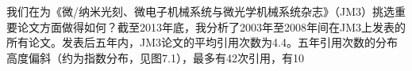 我们在为《微/纳米光刻、微电子机械系统与微光学机械系统杂志》（JM3）挑选重要论文方面做得如何？截至2013年底，我分析了2003年至2008年间在JM3上发表的所有论文。发表后五年内，JM3论文的平均引用次数为4.4。五年引用次数的分布高度偏斜（约为指数分布，见图7.1），最多有42次引用，有10%

